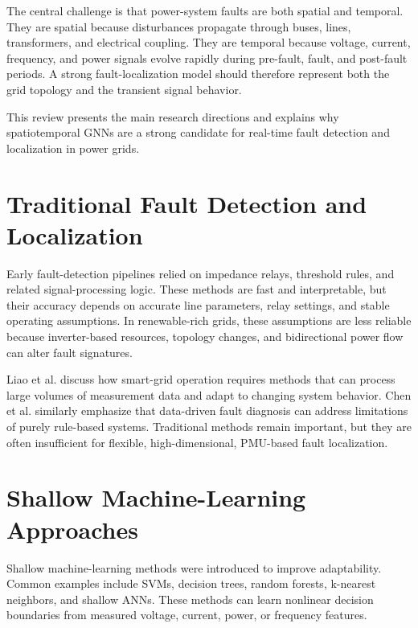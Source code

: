 \documentclass[12pt,a4paper]{article}
\begin{document}
The central challenge is that power-system faults are both spatial and temporal. They are spatial because disturbances propagate through buses, lines, transformers, and electrical coupling. They are temporal because voltage, current, frequency, and power signals evolve rapidly during pre-fault, fault, and post-fault periods. A strong fault-localization model should therefore represent both the grid topology and the transient signal behavior.

This review presents the main research directions and explains why spatiotemporal GNNs are a strong candidate for real-time fault detection and localization in power grids.

\section{Traditional Fault Detection and Localization}

Early fault-detection pipelines relied on impedance relays, threshold rules, and related signal-processing logic. These methods are fast and interpretable, but their accuracy depends on accurate line parameters, relay settings, and stable operating assumptions. In renewable-rich grids, these assumptions are less reliable because inverter-based resources, topology changes, and bidirectional power flow can alter fault signatures.

Liao et al. \cite{liao2021} discuss how smart-grid operation requires methods that can process large volumes of measurement data and adapt to changing system behavior. Chen et al. \cite{chen2020} similarly emphasize that data-driven fault diagnosis can address limitations of purely rule-based systems. Traditional methods remain important, but they are often insufficient for flexible, high-dimensional, PMU-based fault localization.

\section{Shallow Machine-Learning Approaches}

Shallow machine-learning methods were introduced to improve adaptability. Common examples include SVMs, decision trees, random forests, k-nearest neighbors, and shallow ANNs. These methods can learn nonlinear decision boundaries from measured voltage, current, power, or frequency features.
\end{document}
